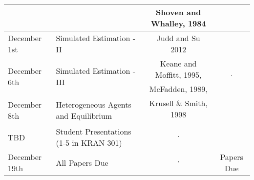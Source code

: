 \documentclass[a4paper]{article}
\begin{document}
\begin{table}[ht!]
\begin{tabular}{|l|l|c|c|}
 &  & Shoven and Whalley, 1984 & \\
\hline
\multirow{2}{*}{December 1st} & \multirow{2}{*}{Simulated Estimation - II} & \multirow{2}{*}{Judd and Su 2012} & \\
 &    &  &  \\
\hline
\multirow{2}{*}{December 6th} & \multirow{2}{*}{Simulated Estimation - III} &  Keane and Moffitt, 1995,  & \multirow{2}{*}{$\cdot$}\\
&   &  McFadden, 1989,  & \\
\hline
\multirow{2}{*}{December 8th} & \multirow{2}{*}{Heterogeneous Agents and Equilibrium} & Krusell \& Smith, 1998 & \\
 &  &  & \\
\hline
TBD & Student Presentations (1-5 in KRAN 301) & $\cdot$ & \\
\hline
December 19th & All Papers Due & $\cdot$ & Papers Due\\
\hline
\end{tabular}
\end{table}

\clearpage
\nocite{*}



\end{document}
